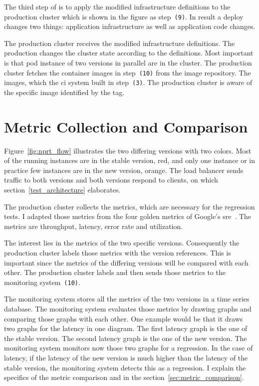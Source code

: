 The third step of \deployer is to apply the modified infrastructure definitions to the
production cluster which is shown in the figure as step~\texttt{(9)}. In result a deploy
changes two things: application infrastructure as well as application code changes.

The production cluster receives the modified infrastructure definitions. The production
changes the cluster state according to the definitions. Most important is that pod
instance of two versions in parallel are in the cluster. The production cluster fetches
the container images in step~\texttt{(10)} from the image repository. The images, which
the \gls{ci} system built in step~\texttt{(3)}. The production cluster is aware of the
specific image identified by the tag.

\section{Metric Collection and Comparison}

Figure~\ref{fig:nprt_flow} illustrates the two differing versions with two colors. Most of
the running instances are in the stable version, red, and only one instance or in practice
few instances are in the new version, orange. The load balancer sends traffic to both
versions and both versions respond to clients, on which section~\ref{test_architecture}
elaborates.

The production cluster collects the metrics, which are necessary for the regression tests.
I adapted those metrics from the four golden metrics of Google's
\gls{sre}~\cite{sre_monitoring}. The metrics are throughput, latency, error rate and
utilization.

The interest lies in the metrics of the two specific versions. Consequently the production
cluster labels those metrics with the version references. This is important since the
metrics of the differing versions will be compared with each other. The production cluster
labels and then sends those metrics to the monitoring system~\texttt{(10)}.

The monitoring system stores all the metrics of the two versions in a time series
database. The monitoring system evaluates those metrics by drawing graphs and comparing
those graphs with each other. One example would be that it draws two graphs for the
latency in one diagram. The first latency graph is the one of the stable version. The
second latency graph is the one of the new version. The monitoring system monitors now
those two graphs for a regression. In the case of latency, if the latency of the new
version is much higher than the latency of the stable version, the monitoring system
detects this as a regression. I explain the specifics of the metric comparison and in the
section~\ref{sec:metric_comparison}.

